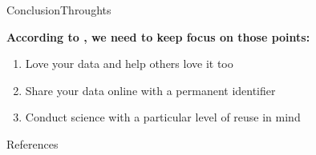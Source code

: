 \documentclass[table]{eecslides}
\begin{document}

\begin{frame}{Conclusion}{Throughts}

\textbf{According to \citet{Goodman2014}, we need to keep focus on those points:}
	\begin{enumerate}
		\item Love your data and help others love it too
		\item Share your data online with a permanent identifier
		\item Conduct science with a particular level of reuse in mind
	\end{enumerate}
\end{frame}



\nocite{Poisot2013a}

\begin{frame}[allowsframebreaks]{References}
	
		
\end{frame}
\end{document}
